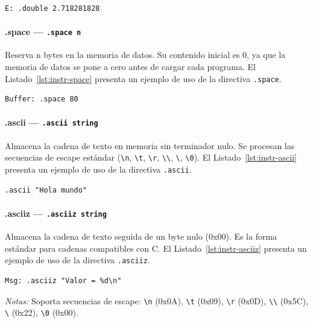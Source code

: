 \documentclass[../main.tex]{subfiles}
\begin{document}
\begin{lstlisting}[caption={.double},label={lst:instr-double}]
	E: .double 2.718281828
\end{lstlisting}

\paragraph*{.space --- \texttt{.space n}}
Reserva n bytes en la memoria de datos. Su contenido inicial es 0, ya que la memoria de datos se pone a cero antes de cargar cada programa.
El Listado~\ref{lst:instr-space} presenta un ejemplo de uso de la directiva \texttt{.space}.

\begin{lstlisting}[caption={.space},label={lst:instr-space}]
	Buffer: .space 80
\end{lstlisting}

\paragraph*{.ascii --- \texttt{.ascii \textquotedbl string\textquotedbl}}
Almacena la cadena de texto en memoria sin terminador nulo. Se procesan las secuencias de escape estándar (\texttt{\textbackslash n}, \texttt{\textbackslash t}, \texttt{\textbackslash r}, \texttt{\textbackslash\textbackslash}, \texttt{\textbackslash\textquotedbl}, \texttt{\textbackslash 0}).
El Listado~\ref{lst:instr-ascii} presenta un ejemplo de uso de la directiva \texttt{.ascii}.

\begin{lstlisting}[caption={.ascii},label={lst:instr-ascii}]
	.ascii "Hola mundo"
\end{lstlisting}

\paragraph*{.asciiz --- \texttt{.asciiz \textquotedbl string\textquotedbl}}
Almacena la cadena de texto seguida de un byte nulo (0x00). Es la forma estándar para cadenas compatibles con C.
El Listado~\ref{lst:instr-asciiz} presenta un ejemplo de uso de la directiva \texttt{.asciiz}.

\begin{lstlisting}[caption={.asciiz},label={lst:instr-asciiz}]
	Msg: .asciiz "Valor = %d\n"
\end{lstlisting}
\textit{Notas:} Soporta secuencias de escape: \texttt{\textbackslash n} (0x0A), \texttt{\textbackslash t} (0x09), \texttt{\textbackslash r} (0x0D), \texttt{\textbackslash\textbackslash} (0x5C), \texttt{\textbackslash\textquotedbl} (0x22), \texttt{\textbackslash 0} (0x00).
\end{document}

